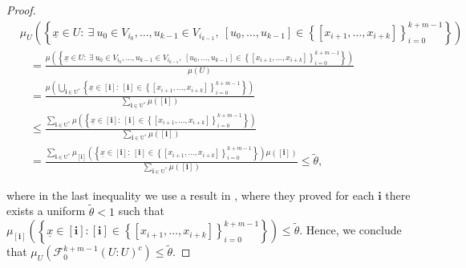 \documentclass[11pt, reqno]{amsart}
\theoremstyle{plain}%
\theoremstyle{definition}
\theoremstyle{definition}
\def\F{\ensuremath{\mathcal F}}
\def\ulx{\underline{x}}
\def\i{\textbf{i}}
\numberwithin{equation}{section}
\begin{document}
\begin{proof}
\begin{align*}
   & \mu_U\left(\left\{ \ulx\in U:\ \exists\ u_0\in V_{i_0},\ldots,u_{k-1}\in V_{i_{k-1}}, \ [u_0,\ldots,u_{k-1}]\in \left\{[x_{i+1},\ldots,x_{i+k}]\right\}_{i=0}^{k+m-1} \right\}\right)\\&\ \ \ \ =\frac{ \mu\left(\left\{ \ulx\in U:\ \exists\ u_0\in V_{i_0},\ldots,u_{k-1}\in V_{i_{k-1}}, \ [u_0,\ldots,u_{k-1}]\in \left\{[x_{i+1},\ldots,x_{i+k}]\right\}_{i=0}^{k+m-1} \right\}\right)}{\mu(U)}\\& \ \ \ \  = \frac{\mu\left(\bigcup_{\mathbf{i}\in \mathrm{U^*}}\left\{ \ulx\in [\i]:\ [\i]\in \left\{[x_{i+1},\ldots,x_{i+k}]\right\}_{i=0}^{k+m-1} \right\}\right)}{\sum_{\mathbf{i}\in \mathrm{U^*}}\mu([\textbf{i}]) }\\& \ \ \ \ \le \frac{\sum_{\mathbf{i}\in \mathrm{U^*}}\mu\left(\left\{ \ulx\in [\i]:\ [\i]\in \left\{[x_{i+1},\ldots,x_{i+k}]\right\}_{i=0}^{k+m-1} \right\}\right)}{\sum_{\mathbf{i}\in \mathrm{U^*}}\mu([\textbf{i}]) }\\&
   \ \ \ \ = \frac{\sum_{\mathbf{i}\in \mathrm{U^*}}\mu_{[\textbf{i}]}\left(\left\{ \ulx\in [\i]:\ [\i]\in \left\{[x_{i+1},\ldots,x_{i+k}]\right\}_{i=0}^{k+m-1} \right\}\right) \mu([\textbf{i}])}{\sum_{\mathbf{i}\in \mathrm{U^*}}\mu([\textbf{i}]) } \le \tilde{\theta},
\end{align*}

where in the last inequality we use a result in \cite[p16]{MikeNatali}, where they proved for each $\i$ there exists a uniform $\tilde{\theta}<1$ such that
$ \mu_{[\i]}\left( \left\{ \ulx\in [\i]: [\i]\in \left\{[x_{i+1},\ldots,x_{i+k}]\right\}_{i=0}^{k+m-1} \right\}\right)\le \tilde{\theta}.$ Hence, we conclude that $\mu_U\left( {\F_0^{k+m-1}(U:U)^c}\right) \le \tilde{\theta}$. 



\end{proof}
\end{document}

